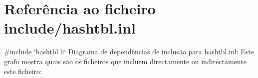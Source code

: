 \hypertarget{hashtbl_8inl}{}\section{Referência ao ficheiro include/hashtbl.inl}
\label{hashtbl_8inl}
{\ttfamily \#include \char`\"{}hashtbl.\+h\char`\"{}}\newline
Diagrama de dependências de inclusão para hashtbl.\+inl\+:
Este grafo mostra quais são os ficheiros que incluem directamente ou indirectamente este ficheiro\+:
